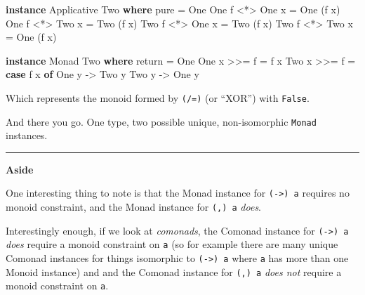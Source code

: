 \documentclass[]{article}
\newenvironment{Shaded}{}{}
\newcommand{\DataTypeTok}[1]{\textcolor[rgb]{0.56,0.13,0.00}{#1}}
\newcommand{\FunctionTok}[1]{\textcolor[rgb]{0.02,0.16,0.49}{#1}}
\newcommand{\KeywordTok}[1]{\textcolor[rgb]{0.00,0.44,0.13}{\textbf{#1}}}
\newcommand{\NormalTok}[1]{#1}
\newcommand{\OperatorTok}[1]{\textcolor[rgb]{0.40,0.40,0.40}{#1}}
\newcommand{\OtherTok}[1]{\textcolor[rgb]{0.00,0.44,0.13}{#1}}
\begin{document}
\begin{Shaded}
\begin{Highlighting}[]
\KeywordTok{instance} \DataTypeTok{Applicative} \DataTypeTok{Two} \KeywordTok{where}
    \FunctionTok{pure} \OtherTok{=} \DataTypeTok{One}
    \DataTypeTok{One}\NormalTok{ f }\OperatorTok{\textless{}*\textgreater{}} \DataTypeTok{One}\NormalTok{ x }\OtherTok{=} \DataTypeTok{One}\NormalTok{ (f x)}
    \DataTypeTok{One}\NormalTok{ f }\OperatorTok{\textless{}*\textgreater{}} \DataTypeTok{Two}\NormalTok{ x }\OtherTok{=} \DataTypeTok{Two}\NormalTok{ (f x)}
    \DataTypeTok{Two}\NormalTok{ f }\OperatorTok{\textless{}*\textgreater{}} \DataTypeTok{One}\NormalTok{ x }\OtherTok{=} \DataTypeTok{Two}\NormalTok{ (f x)}
    \DataTypeTok{Two}\NormalTok{ f }\OperatorTok{\textless{}*\textgreater{}} \DataTypeTok{Two}\NormalTok{ x }\OtherTok{=} \DataTypeTok{One}\NormalTok{ (f x)}

\KeywordTok{instance} \DataTypeTok{Monad} \DataTypeTok{Two} \KeywordTok{where}
    \FunctionTok{return} \OtherTok{=} \DataTypeTok{One}
    \DataTypeTok{One}\NormalTok{ x }\OperatorTok{\textgreater{}\textgreater{}=}\NormalTok{ f }\OtherTok{=}\NormalTok{ f x}
    \DataTypeTok{Two}\NormalTok{ x }\OperatorTok{\textgreater{}\textgreater{}=}\NormalTok{ f }\OtherTok{=} \KeywordTok{case}\NormalTok{ f x }\KeywordTok{of}
                    \DataTypeTok{One}\NormalTok{ y }\OtherTok{{-}\textgreater{}} \DataTypeTok{Two}\NormalTok{ y}
                    \DataTypeTok{Two}\NormalTok{ y }\OtherTok{{-}\textgreater{}} \DataTypeTok{One}\NormalTok{ y}
\end{Highlighting}
\end{Shaded}

Which represents the monoid formed by \texttt{(/=)} (or ``XOR'') with
\texttt{False}.

And there you go. One type, two possible unique, non-isomorphic \texttt{Monad}
instances.

\begin{center}\rule{0.5\linewidth}{0.5pt}\end{center}

\textbf{Aside}

One interesting thing to note is that the Monad instance for
\texttt{(-\textgreater{})\ a} requires no monoid constraint, and the Monad
instance for \texttt{(,)\ a} \emph{does}.

Interestingly enough, if we look at \emph{comonads}, the Comonad instance for
\texttt{(-\textgreater{})\ a} \emph{does} require a monoid constraint on
\texttt{a} (so for example there are many unique Comonad instances for things
isomorphic to \texttt{(-\textgreater{})\ a} where \texttt{a} has more than one
Monoid instance) and and the Comonad instance for \texttt{(,)\ a} \emph{does
not} require a monoid constraint on \texttt{a}.
\end{document}

